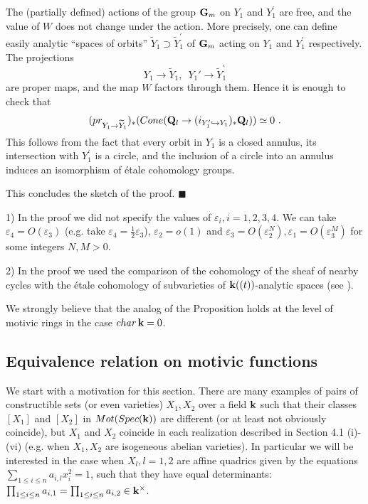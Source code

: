 \documentclass[12pt]{article}
\begin{document}
The (partially defined) actions of the group ${\bf G}_m$ on $Y_1$ and $Y_1^{\prime}$ are free, and the value of $W$ does not change under the action. 
More precisely, one can define easily analytic ``spaces of orbits'' $\widetilde{Y}_1\supset \widetilde{Y}_1^{\prime}$  
of ${\bf G}_m$ acting on $Y_1$ and $Y_1^{\prime}$ respectively. The projections
$$Y_1\to \widetilde{Y}_1,\,\,\, Y_1'\to \widetilde{Y}_1^{\prime}$$
are proper maps, and the map $W$ factors through them.
  Hence it is enough to check that
  $$(pr_{Y_1\to \widetilde{Y}_1})_*(Cone({\bf Q}_l\to (i_{Y_1'\hookrightarrow Y_1})_*{\bf Q}_l))\simeq 0\,\,.    $$
This follows from the fact that every orbit in $Y_1$ is a closed annulus, its intersection with $Y_1^{\prime}$ is a circle,
 and the inclusion of a circle into an annulus induces an isomorphism of \'etale cohomology groups.

 This concludes the sketch of the proof. $\blacksquare$




\begin{rmk} 1) In the proof we did not specify the values of $\varepsilon_i, i=1,2,3,4$. We can take $\varepsilon_4=O(\varepsilon_3)$ (e.g. take $\varepsilon_4=\frac{1}{2}\varepsilon_3$), $\varepsilon_2=o(1)$ and $\varepsilon_3=O(\varepsilon_2^N),\varepsilon_1=O(\varepsilon_3^M)$ for some integers $N,M>0$.

2) In the proof we used the comparison of the cohomology of the sheaf of nearby cycles with the \'etale cohomology of subvarieties of ${\bf k}((t))$-analytic spaces (see \cite{NicS}).
\end{rmk}

We strongly believe that the analog of the Proposition holds at the level of motivic rings in the case $char\,{\bf k}=0$.








\subsection{Equivalence relation on motivic functions}


We start with a motivation for this section. There are many examples of pairs of constructible sets (or even varieties) $X_1,X_2$ over a field ${\bf k}$ such that their classes $[X_1]$ and $[X_2]$ in $Mot(Spec({\bf k}))$ are different
(or at least not obviously coincide), but $X_1$ and $X_2$ coincide in each realization described in Section 4.1 (i)-(vi) (e.g.  when $X_1,X_2$ are isogeneous abelian varieties). In particular we will be interested in the case when
$X_l,l=1,2$ are affine quadrics given by the equations $\sum_{1\le i\le n}a_{i,l}x_i^2=1$,
such that they have equal determinants: $\prod_{1\le i\le n}a_{i,1}=\prod_{1\le i\le n}a_{i,2}\in {\bf k}^{\times}$.
\end{document}
